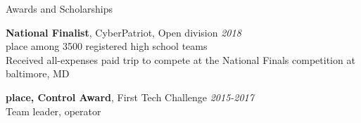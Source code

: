 	\begin{rSection}{Awards and Scholarships} 

		{\bf National Finalist}{, CyberPatriot, Open division} \hfill{\em 2018} \\
		 place among 3500 registered high school teams \\
		Received all-expenses paid trip to compete at the National Finals competition at baltimore, MD
		
		{\bf {} place, Control Award}{, First Tech Challenge} \hfill{\em 2015-2017} \\
		Team leader,  operator
		
	\end{rSection}



